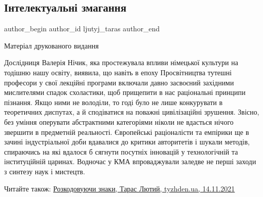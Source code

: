 
 
 
 
 
\subsection{Інтелектуальні змагання}
\label{sec:05_12_2021.stz.news.ua.tyzhden.1.intellektualni_zmagannja}

\ifcmt
 author_begin
   author_id ljutyj_taras
 author_end
\fi

Матеріал друкованого видання 


Дослідниця Валерія Нічик, яка простежувала впливи німецької культури на тодішню
нашу освіту, виявила, що навіть в епоху Просвітництва тутешні професори у свої
лекційні програми включали давно засвоєний західними мислителями спадок
схоластики, щоб прищепити в нас раціональні принципи пізнання. Якщо ними не
володіли, то годі було не лише конкурувати в теоретичних диспутах, а й
сподіватися на поважні цивілізаційні зрушення. Звісно, без уміння оперувати
абстракт­ними категоріями ніколи не вдасться нічого звершити в предметній
реальності. Європейські раціоналісти та емпірики ще в зачині індустріальної
доби вдавалися до критики авторитетів і шукали методів, спираючись на які
вдалося б сягнути посутніх інновацій у технологічній та інституційній царинах.
Водночас у КМА впроваджували заледве не перші заходи з синтезу наук і мистецтв.

Читайте також: \href{https://tyzhden.ua/Columns/50/253612}{Розкодовуючи знаки, %
Тарас Лютий, tyzhden.ua, 14.11.2021}

